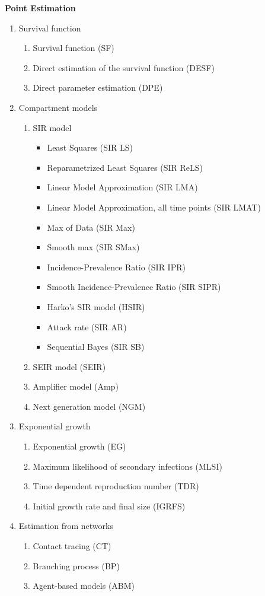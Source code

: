 \documentclass[12pt]{article}
\begin{document}
\textbf{Point Estimation}
\begin{enumerate}
\item Survival function
  \begin{enumerate}
  \item Survival function (SF)
  \item Direct estimation of the survival function (DESF)
  \item Direct parameter estimation (DPE)

  \end{enumerate}
\item Compartment models 
  \begin{enumerate}
  \item SIR model
    \begin{itemize}
    \item Least Squares (SIR LS)
    \item Reparametrized Least Squares (SIR ReLS)
    \item Linear Model Approximation (SIR LMA)
    \item Linear Model Approximation, all time points (SIR LMAT)
    \item Max of Data (SIR Max)
    \item Smooth max (SIR SMax)
    \item Incidence-Prevalence Ratio (SIR IPR)
    \item Smooth Incidence-Prevalence Ratio (SIR SIPR)
    \item Harko's SIR model (HSIR)
    \item Attack rate (SIR AR)
    \item Sequential Bayes (SIR SB)
    \end{itemize}
  \item SEIR model (SEIR)
  \item Amplifier model (Amp)
  \item Next generation model (NGM)
  \end{enumerate}
\item Exponential growth 
  \begin{enumerate}
  \item Exponential growth (EG)
  \item Maximum likelihood of secondary infections (MLSI)
  \item Time dependent reproduction number (TDR)
  \item Initial growth rate and final size (IGRFS)
  \end{enumerate}
\item Estimation from networks 
  \begin{enumerate}
  \item Contact tracing (CT)
  \item Branching process (BP)
  \item Agent-based models (ABM)
  \end{enumerate}
  \end{enumerate}
\end{document}
